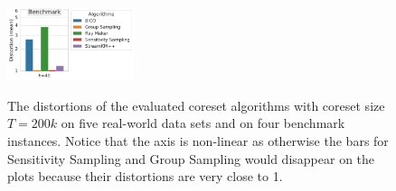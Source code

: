 \begin{figure}
{    \includegraphics[width=0.331\textwidth]{figures/distortions-mean-Benchmark-k40.pdf}
  }
  \caption{The distortions of the evaluated coreset algorithms with coreset size $T=200k$ on five real-world data sets and on four benchmark instances. Notice that the axis is non-linear as otherwise the bars for Sensitivity Sampling and Group Sampling would disappear on the plots because their distortions are very close to 1.}
  \label{fig:distortions}
\end{figure}







